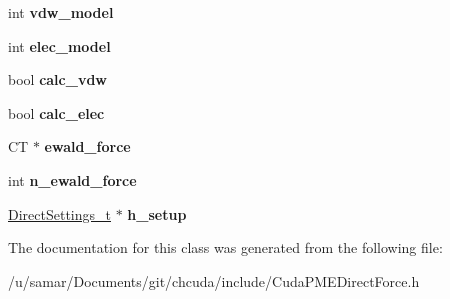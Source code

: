 \begin{DoxyCompactItemize}
int {\bfseries vdw\+\_\+model}
\item 
\hypertarget{classCudaPMEDirectForce_a51dd63375c1d2d7a0ce2bdd4e9b54fbd}{}\label{classCudaPMEDirectForce_a51dd63375c1d2d7a0ce2bdd4e9b54fbd} 
int {\bfseries elec\+\_\+model}
\item 
\hypertarget{classCudaPMEDirectForce_a06b0a24d8f633f58f9e871043e66b498}{}\label{classCudaPMEDirectForce_a06b0a24d8f633f58f9e871043e66b498} 
bool {\bfseries calc\+\_\+vdw}
\item 
\hypertarget{classCudaPMEDirectForce_aeea16163d9878c281ebb4ffb7a25b6fd}{}\label{classCudaPMEDirectForce_aeea16163d9878c281ebb4ffb7a25b6fd} 
bool {\bfseries calc\+\_\+elec}
\item 
\hypertarget{classCudaPMEDirectForce_a56269071dd0988ba22fcaa261130f635}{}\label{classCudaPMEDirectForce_a56269071dd0988ba22fcaa261130f635} 
CT $\ast$ {\bfseries ewald\+\_\+force}
\item 
\hypertarget{classCudaPMEDirectForce_a0d30e916d121a8937cc4ab6169c9fa08}{}\label{classCudaPMEDirectForce_a0d30e916d121a8937cc4ab6169c9fa08} 
int {\bfseries n\+\_\+ewald\+\_\+force}
\item 
\hypertarget{classCudaPMEDirectForce_a34fdb0fe96c7fe5d2967a61dc4871bf8}{}\label{classCudaPMEDirectForce_a34fdb0fe96c7fe5d2967a61dc4871bf8} 
\hyperlink{structDirectSettings__t}{Direct\+Settings\+\_\+t} $\ast$ {\bfseries h\+\_\+setup}
\end{DoxyCompactItemize}


The documentation for this class was generated from the following file\+:\begin{DoxyCompactItemize}
\item 
/u/samar/\+Documents/git/chcuda/include/Cuda\+P\+M\+E\+Direct\+Force.\+h\end{DoxyCompactItemize}

